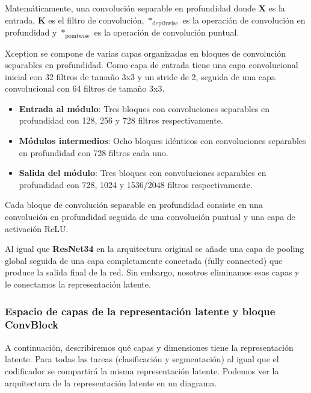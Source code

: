 Matemáticamente, una convolución separable en profundidad donde \(\mathbf{X}\) es la entrada, \(\mathbf{K}\) es el filtro de convolución, \(*_{\text{depthwise}}\) es la operación de convolución en profundidad y \(*_{\text{pointwise}}\) es la operación de convolución puntual.

Xception se compone de varias capas organizadas en bloques de convolución separables en profundidad. Como capa de entrada tiene una capa convolucional inicial con 32 filtros de tamaño 3x3 y un stride de 2, seguida de una capa convolucional con 64 filtros de tamaño 3x3.

\begin{itemize}
	\item \textbf{Entrada al módulo}: Tres bloques con convoluciones separables en profundidad con 128, 256 y 728 filtros respectivamente.
	\item \textbf{Módulos intermedios}: Ocho bloques idénticos con convoluciones separables en profundidad con 728 filtros cada uno.
	\item \textbf{Salida del módulo}: Tres bloques con convoluciones separables en profundidad con 728, 1024 y 1536/2048 filtros respectivamente.
\end{itemize}

Cada bloque de convolución separable en profundidad consiste en una convolución en profundidad seguida de una convolución puntual y una capa de activación ReLU.

Al igual que \textbf{ResNet34} en la arquitectura original se añade una capa de pooling global seguida de una capa completamente conectada (fully connected) que produce la salida final de la red. Sin embargo, nosotros eliminamos esas capas y le conectamos la representación latente.

\subsubsection{Espacio de capas de la representación latente y bloque ConvBlock}

A continuación, describiremos qué capas y dimensiones tiene la representación latente. Para todas las tareas (clasificación y segmentación) al igual que el codificador se compartirá la misma representación latente. Podemos ver la arquitectura de la representación latente en un diagrama.


